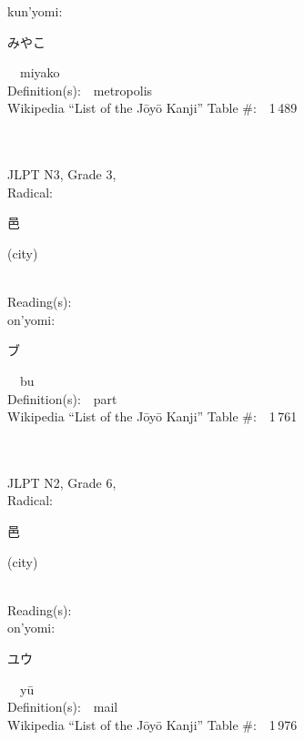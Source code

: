 \begin{multicols}{2}
{\hspace*{1em}}kun'yomi:\ \ \\
{\hspace*{2em}}{\begin{CJK}{UTF8}{min} みやこ \end{CJK}}\ \ miyako\ \ \\
Definition(s):\ \ metropolis \\
Wikipedia ``List of the J\=oy\=o Kanji'' Table \#:\ \ 1\,489 \\
\ \ \\
{\fontsize{34pt}{40pt}  }\ \ \\  %
{JLPT N3, Grade 3, \\Radical:\ \ {\begin{CJK}{UTF8}{min} 邑 \end{CJK}} (city) } \\
Reading(s):\ \ \\
{\hspace*{1em}}on'yomi:\ \ \\
{\hspace*{2em}}{\begin{CJK}{UTF8}{min} ブ \end{CJK}}\ \ bu\ \ \\
Definition(s):\ \ part \\
Wikipedia ``List of the J\=oy\=o Kanji'' Table \#:\ \ 1\,761 \\
\ \ \\
{\fontsize{34pt}{40pt}  }\ \ \\  %
{JLPT N2, Grade 6, \\Radical:\ \ {\begin{CJK}{UTF8}{min} 邑 \end{CJK}} (city) } \\
Reading(s):\ \ \\
{\hspace*{1em}}on'yomi:\ \ \\
{\hspace*{2em}}{\begin{CJK}{UTF8}{min} ユウ \end{CJK}}\ \ y\=u\ \ \\
Definition(s):\ \ mail \\
Wikipedia ``List of the J\=oy\=o Kanji'' Table \#:\ \ 1\,976 \\
\ \ \\
\end{multicols}


